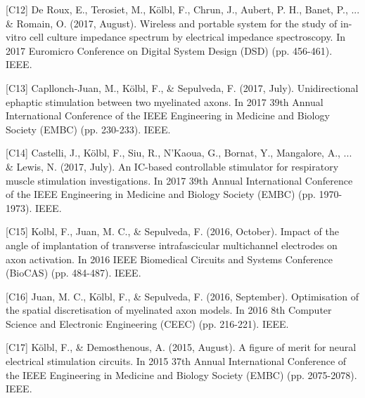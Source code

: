 \begin{cvskills}    
  \cvskill
    {[C12]} %
    {De Roux, E., Terosiet, M., Kölbl, F., Chrun, J., Aubert, P. H., Banet, P., ... \& Romain, O. (2017, August). Wireless and portable system for the study of in-vitro cell culture impedance spectrum by electrical impedance spectroscopy. In 2017 Euromicro Conference on Digital System Design (DSD) (pp. 456-461). IEEE.} %
\end{cvskills}  
\begin{cvskills}    
  \cvskill
    {[C13]} %
    {Capllonch-Juan, M., Kölbl, F., \& Sepulveda, F. (2017, July). Unidirectional ephaptic stimulation between two myelinated axons. In 2017 39th Annual International Conference of the IEEE Engineering in Medicine and Biology Society (EMBC) (pp. 230-233). IEEE.} %
\end{cvskills}  
\begin{cvskills}    
  \cvskill
    {[C14]} %
    {Castelli, J., Kölbl, F., Siu, R., N'Kaoua, G., Bornat, Y., Mangalore, A., ... \& Lewis, N. (2017, July). An IC-based controllable stimulator for respiratory muscle stimulation investigations. In 2017 39th Annual International Conference of the IEEE Engineering in Medicine and Biology Society (EMBC) (pp. 1970-1973). IEEE.} %
\end{cvskills}  
\begin{cvskills}
  \cvskill
    {[C15]} %
    {Kolbl, F., Juan, M. C., \& Sepulveda, F. (2016, October). Impact of the angle of implantation of transverse intrafascicular multichannel electrodes on axon activation. In 2016 IEEE Biomedical Circuits and Systems Conference (BioCAS) (pp. 484-487). IEEE.} %
\end{cvskills}  
\begin{cvskills} 
  \cvskill
    {[C16]} %
    {Juan, M. C., Kölbl, F., \& Sepulveda, F. (2016, September). Optimisation of the spatial discretisation of myelinated axon models. In 2016 8th Computer Science and Electronic Engineering (CEEC) (pp. 216-221). IEEE.} %
\end{cvskills}  
\begin{cvskills}
  \cvskill
    {[C17]} %
    {Kölbl, F., \& Demosthenous, A. (2015, August). A figure of merit for neural electrical stimulation circuits. In 2015 37th Annual International Conference of the IEEE Engineering in Medicine and Biology Society (EMBC) (pp. 2075-2078). IEEE.} %
\end{cvskills}  
